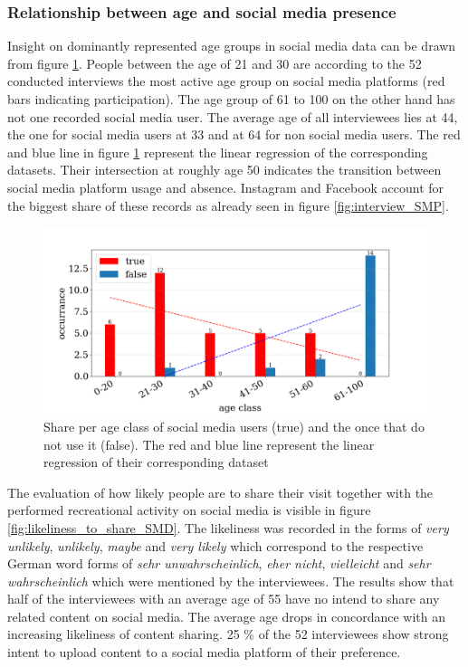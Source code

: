 \subsubsection{Relationship between age and social media presence}
Insight on dominantly represented age groups in social media data can be drawn from figure \ref{fig:interview_age_SMP}.
People between the age of 21 and 30 are according to the 52 conducted interviews the most active age group on social media platforms (red bars indicating participation). The age group of 61 to 100 on the other hand has not one recorded social media user. The average age of all interviewees lies at 44, the one for social media users at 33 and at 64 for non social media users. The red and blue line in figure \ref{fig:interview_age_SMP} represent the linear regression of the corresponding datasets. Their intersection at roughly age 50 indicates the transition between social media platform usage and absence. Instagram and Facebook account for the biggest share of these records as already seen in figure \ref{fig:interview_SMP}.

\begin{figure}[!htb]
   \centering
   \includegraphics[width=\textwidth]{img/interview_socialmedia_age_bigger_font.pdf}
   \caption{Share per age class of social media users (true) and the once that do not use it (false). The red and blue line represent the linear regression of their corresponding dataset}
   \label{fig:interview_age_SMP}
\end{figure}

The evaluation of how likely people are to share their visit together with the performed recreational activity on social media is visible in figure \ref{fig:likeliness_to_share_SMD}. The likeliness was recorded in the forms of \textit{very unlikely}, \textit{unlikely}, \textit{maybe} and \textit{very likely} which correspond to the respective German word forms of \textit{sehr unwahrscheinlich}, \textit{eher nicht}, \textit{vielleicht} and \textit{sehr wahrscheinlich} which were mentioned by the interviewees. The results show that half of the interviewees with an average age of 55 have no intend to share any related content on social media. The average age drops in concordance with an increasing likeliness of content sharing. 25 \% of the 52 interviewees show strong intent to upload content to a social media platform of their preference.

